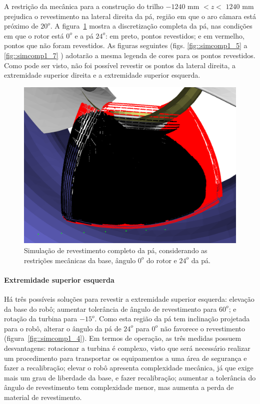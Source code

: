 A restrição da mecânica para a construção do trilho $-1240$ mm $< z <$ $1240$ mm
prejudica o revestimento na lateral direita da pá, região em que o aro câmara
está próximo de $20^o$. A figura~\ref{fig::simcomp1_1} mostra a
discretização completa da pá, nas condições em que o rotor está $0^o$ e a pá
$24^o$:
em preto, pontos revestidos; e em vermelho, pontos que não foram revestidos. As
figuras seguintes (figs. \ref{fig::simcomp1_5} a \ref{fig::simcomp1_7} )
adotarão a mesma legenda de cores para os pontos revestidos.
Como pode ser visto, não foi possível revestir os pontos da lateral direita, a extremidade superior direita e a extremidade superior esquerda.

\begin{figure}[!ht]
	\centering	
	\includegraphics[width=0.7\columnwidth]{method/figs/simcomp1_1.png}
	\caption{Simulação de revestimento completo da pá, considerando as
	restrições mecânicas da base, ângulo $0^o$ do rotor e $24^o$ da pá.}
	\label{fig::simcomp1_1}
\end{figure}

\paragraph{Extremidade superior esquerda}
Há três possíveis soluções para revestir a extremidade superior esquerda:
elevação da base do robô; aumentar tolerância de ângulo de revestimento para
$60^o$; e rotação da turbina para $-15^o$. Como esta
região da pá tem inclinação projetada para o robô, alterar o ângulo da pá de $24^o$ para $0^o$ não favorece o
revestimento (figura~\ref{fig::simcomp1_4}). Em termos de operação, as três
medidas possuem desvantagens: rotacionar a turbina é complexo, visto que será
necessário realizar um procedimento para transportar os equipamentos a uma área
de segurança e fazer a recalibração; elevar o robô apresenta complexidade
mecânica, já que exige mais um grau de liberdade da base, e fazer recalibração;
aumentar a tolerância do ângulo de revestimento tem complexidade menor, mas
aumenta a perda de material de revestimento.


